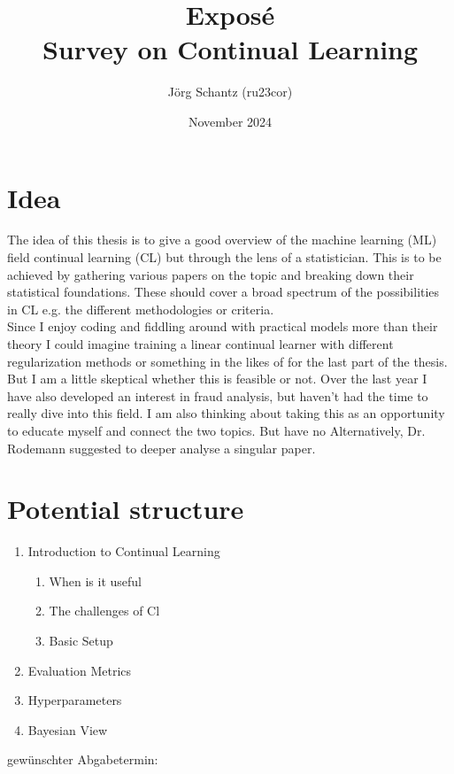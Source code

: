 \documentclass[12pt, a4paper]{report}
\title{Exposé\\
	\Large{Survey on Continual Learning}}
\author{Jörg Schantz (ru23cor)}
\date{November 2024}
\begin{document}
	\maketitle
	\renewcommand{\labelenumii}{\arabic{enumi}.\arabic{enumii}}
	\renewcommand{\labelenumiii}{\arabic{enumi}.\arabic{enumii}.\arabic{enumiii}}
	\renewcommand{\labelenumiv}{\arabic{enumi}.\arabic{enumii}.arabic{enumiii}.\arabic{enumiv}}
\section*{Idea}
	The idea of this thesis is to give a good overview of the machine learning (ML) field continual learning (CL) but through the lens of a statistician. This is to be achieved by gathering various papers on the topic and breaking down their statistical foundations. These should cover a broad spectrum of the possibilities in CL e.g. the different methodologies or criteria.\\
	Since I enjoy coding and fiddling around with practical models more than their theory I could imagine training a linear continual learner with different regularization methods or something in the likes of for the last part of the thesis. But I am a little skeptical whether this is feasible or not. Over the last year I have also developed an interest in fraud analysis, but haven't had the time to really dive into this field. I am also thinking about taking this as an opportunity to educate myself and connect the two topics. But have no  Alternatively, Dr. Rodemann suggested to deeper analyse a singular paper.\\
\section*{Potential structure}
	\begin{enumerate}
		\item Introduction to Continual Learning
			\begin{enumerate}
				\item When is it useful
				\item The challenges of Cl
				\item Basic Setup
			\end{enumerate}
		\item Evaluation Metrics
		\item Hyperparameters
		\item Bayesian View 
	\end{enumerate}
	gewünschter Abgabetermin:\\
\end{document}
